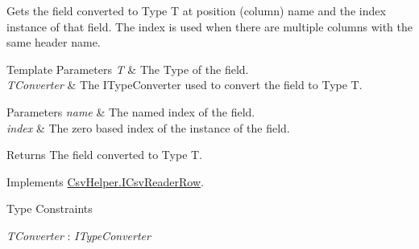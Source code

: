 Gets the field converted to Type T at position (column) name and the index instance of that field. The index is used when there are multiple columns with the same header name. 


\begin{DoxyTemplParams}{Template Parameters}
{\em T} & The Type of the field.\\
\hline
{\em T\-Converter} & The I\-Type\-Converter used to convert the field to Type T.\\
\hline
\end{DoxyTemplParams}

\begin{DoxyParams}{Parameters}
{\em name} & The named index of the field.\\
\hline
{\em index} & The zero based index of the instance of the field.\\
\hline
\end{DoxyParams}
\begin{DoxyReturn}{Returns}
The field converted to Type T.
\end{DoxyReturn}


Implements \hyperlink{a00091_a6a55c1b2fc98eb7ef4bdb73e80f4b093}{Csv\-Helper.\-I\-Csv\-Reader\-Row}.

\begin{Desc}
\item[Type Constraints]\begin{description}
\item[{\em T\-Converter} : {\em I\-Type\-Converter}]\end{description}
\end{Desc}

